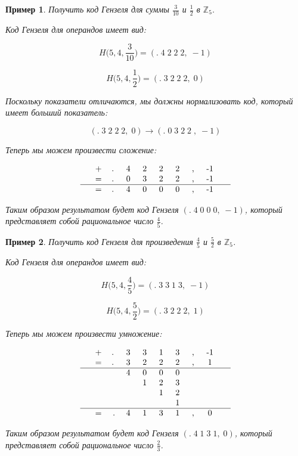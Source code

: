 \documentclass[master, och, diploma, times]{sty/SCWorks}
\theoremstyle{plain}
\newtheorem{exmp}{Пример}[section]
\theoremstyle{definition}
\begin{document}
\begin{exmp}
Получить код Гензеля для суммы $\frac{3}{10}$ и $\frac{1}{2}$ в $\mathbb{Z}_5$.

\noindent Код Гензеля для операндов имеет вид:

$$H\bigg(5,4, \frac{3}{10}\bigg)=(.\; 4\; 2\; 2\; 2,\; -1)$$

$$H\bigg(5,4, \frac{1}{2}\bigg)=(.\; 3\; 2\; 2\; 2,\; 0)$$


\noindent Поскольку показатели отличаются, мы должны нормализовать код, который имеет больший показатель:

$$ 
(.\; 3\; 2\; 2\; 2,\; 0) \rightarrow (.\; 0 \; 3\; 2\; 2\; ,\; -1)
$$

\noindent Теперь мы можем произвести сложение:

$$
\begin{tabular}{ccccccccccc}
& + & .\; & 4\; & 2\; & 2\; & 2\; & ,\; & -1\; &  \\
& = & .\; & 0\; & 3\; & 2\; & 2\; & ,\; & -1\; &  \\
\hline
& = & .\; & 4\; & 0\; & 0\; & 0\; & ,\; & -1\; &
\end{tabular}
$$


\noindent Таким образом результатом будет код Гензеля $(.\; 4\; 0\; 0\; 0,\; -1)$, который представляет собой рациональное число $\frac{4}{5}$.
\end{exmp}

\begin{exmp}
Получить код Гензеля для произведения $\frac{4}{5}$ и $\frac{5}{2}$ в $\mathbb{Z}_5$.

\noindent Код Гензеля для операндов имеет вид:

$$H\bigg(5,4, \frac{4}{5}\bigg)=(.\; 3\; 3\; 1\; 3,\; -1)$$

$$H\bigg(5,4, \frac{5}{2}\bigg)=(.\; 3\; 2\; 2\; 2,\; 1)$$

\noindent Теперь мы можем произвести умножение:

$$
\begin{tabular}{cccccccccc}
& + & .\; & 3\; & 3\; & 1\; & 3\; & ,\; & -1\; \\
& = & .\; & 3\; & 2\; & 2\; & 2\; & ,\; & 1\; \\
\hline
& & & 4\; & 0\; & 0\; & 0\; & & & \\
& & & & 1\; & 2\; & 3\; & & & \\
& & & & & 1\; & 2\; & & & \\
& & & & & & 1\; & & & \\
\hline
& = & . & 4\; & 1\; & 3\; & 1\; & ,\; & 0\; &
\end{tabular}
$$


\noindent Таким образом результатом будет код Гензеля $(.\; 4\; 1\; 3\; 1,\; 0)$, который представляет собой рациональное число $\frac{2}{3}$.
\end{exmp}
\end{document}
